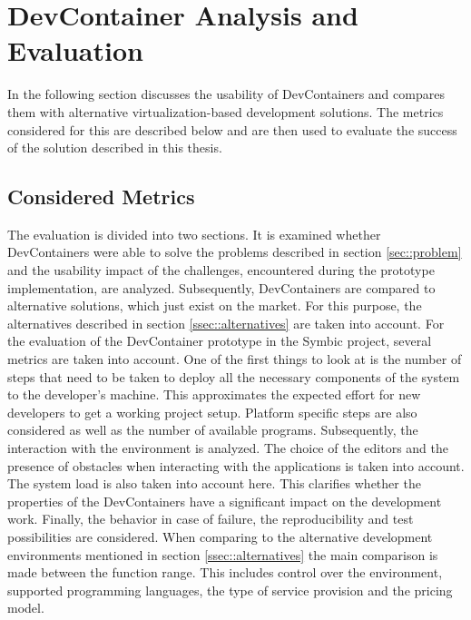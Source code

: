 
\section{DevContainer Analysis and Evaluation}\label{sec::eval}
In the following section discusses the usability of DevContainers and compares them with alternative virtualization-based development solutions. The metrics considered for this are described below and are then used to evaluate the success of the solution described in this thesis.

    \subsection{Considered Metrics}
    The evaluation is divided into two sections. It is examined whether DevContainers were able to solve the problems described in section \ref{sec::problem} and the usability impact of the challenges, encountered during the prototype implementation, are analyzed. Subsequently, DevContainers are compared to alternative solutions, which just exist on the market. For this purpose, the alternatives described in section \ref{ssec::alternatives} are taken into account.\newline
    For the evaluation of the DevContainer prototype in the Symbic project, several metrics are taken into account. One of the first things to look at is the number of steps that need to be taken to deploy all the necessary components of the system to the developer's machine. This approximates the expected effort for new developers to get a working project setup. Platform specific steps are also considered as well as the number of available programs. Subsequently, the interaction with the environment is analyzed. The choice of the editors and the presence of obstacles when interacting with the applications is taken into account. The system load is also taken into account here. This clarifies whether the properties of the DevContainers have a significant impact on the development work. Finally, the behavior in case of failure, the reproducibility and test possibilities are considered. \newline
    When comparing to the alternative development environments mentioned in section \ref{ssec::alternatives} the main comparison is made between the function range. This includes control over the environment, supported programming languages, the type of service provision and the pricing model.

